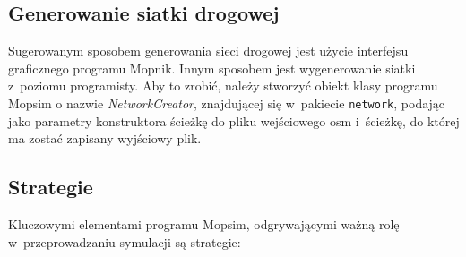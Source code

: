 \subsection{Generowanie siatki drogowej}
Sugerowanym sposobem generowania sieci drogowej jest użycie interfejsu graficznego programu Mopnik. Innym sposobem jest wygenerowanie siatki z~poziomu programisty. Aby to zrobić, należy stworzyć obiekt klasy programu Mopsim o nazwie \textit{NetworkCreator}, znajdującej się w~pakiecie \texttt{network}, podając jako parametry konstruktora ścieżkę do pliku wejściowego osm i~ścieżkę, do której ma zostać zapisany wyjściowy plik.
\subsection{Strategie}
Kluczowymi elementami programu Mopsim, odgrywającymi ważną rolę w~przeprowadzaniu symulacji są strategie:
